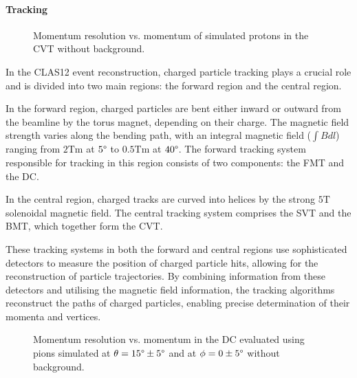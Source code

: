 \paragraph{Tracking}
    \begin{wrapfigure}{r}{0.50\textwidth}
        \caption[CVT momentum resolution vs. momentum.]
        {Momentum resolution vs. momentum of simulated protons in the CVT without background.}
        \label{fig::11.231::cvt_p_resolution}
    \end{wrapfigure}

    In the CLAS12 event reconstruction, charged particle tracking plays a crucial role and is divided into two main regions: the forward region and the central region.

    In the forward region, charged particles are bent either inward or outward from the beamline by the torus magnet, depending on their charge.
    The magnetic field strength varies along the bending path, with an integral magnetic field ($\int Bdl$) ranging from $2 \text{Tm}$ at $5\degree$ to $0.5 \text{Tm}$ at $40\degree$.
    The forward tracking system responsible for tracking in this region consists of two components: the FMT and the DC.

    In the central region, charged tracks are curved into helices by the strong $5 \text{T}$ solenoidal magnetic field.
    The central tracking system comprises the SVT and the BMT, which together form the CVT.

    These tracking systems in both the forward and central regions use sophisticated detectors to measure the position of charged particle hits, allowing for the reconstruction of particle trajectories.
    By combining information from these detectors and utilising the magnetic field information, the tracking algorithms reconstruct the paths of charged particles, enabling precise determination of their momenta and vertices.

    \begin{wrapfigure}{r}{0.50\textwidth}
        \caption[DC momentum resolution vs momentum.]
        {Momentum resolution vs. momentum in the DC evaluated using pions simulated at $\theta = 15\degree \pm 5\degree$ and at $\phi = 0 \pm 5\degree$ without background.}
        \label{fig::11.231::dc_p_resolution}
    \end{wrapfigure}


